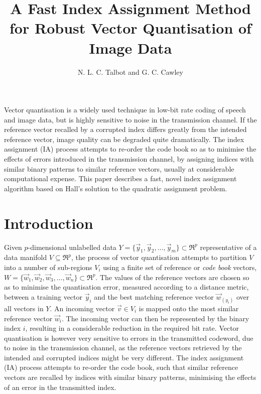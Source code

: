 \documentclass[a4paper]{report}
\title{A Fast Index Assignment Method for Robust Vector Quantisation of Image Data}
\author{N. L. C. Talbot and G. C. Cawley}
\begin{document}
\maketitle
\tableofcontents
Vector quantisation is a widely used technique in low-bit rate coding of speech
and image data, but is highly sensitive to noise in the transmission channel.
If the reference vector recalled by a corrupted index differs greatly from the
intended reference vector, image quality can be degraded quite dramatically.
The index assignment (IA) process attempts to re-order the code book so as to
minimise the effects of errors introduced in the transmission channel, by
assigning indices with similar binary patterns to similar reference vectors,
usually at considerable computational expense.  This paper describes a fast,
novel index assignment algorithm based on Hall's solution to the quadratic
assignment problem.
\chapter{Introduction}

Given $p$-dimensional unlabelled data
$Y = \{\vec{y}_1, \vec{y}_2, \ldots, \vec{y}_m\}\subset\Re^p$ representative
of a data manifold $V \subseteq\Re^p$, the process
of vector quantisation attempts to partition $V$ into a number
of sub-regions $V_i$ using a finite set of reference or \emph{code book}
vectors, $W = \{\vec{w}_1, \vec{w}_2, \vec{w}_3, \ldots, \vec{w}_n\}
\subset\Re^p$.  The values of the reference vectors are chosen so as
to minimise the quantisation error, measured according to a distance metric,
between a training vector $\vec{y}_i$ and the best matching reference vector
$\vec{w}_{(y_i)}$ over all vectors in $Y$.  An incoming vector
$\vec{v} \in V_i$ is mapped onto the most similar reference vector
$\vec{w}_i$.  The incoming vector can then be represented by the binary index $i$,
resulting in a considerable reduction in the required bit rate.
Vector quantisation is however very sensitive to errors in the transmitted
codeword, due to noise in the transmission channel, as the reference vectors
retrieved by the intended and corrupted indices might be very different.  The
index assignment (IA) process attempts to re-order the code book, such that
similar reference vectors are recalled by indices with similar binary
patterns, minimising the effects of an error in the
transmitted index.
\end{document}

